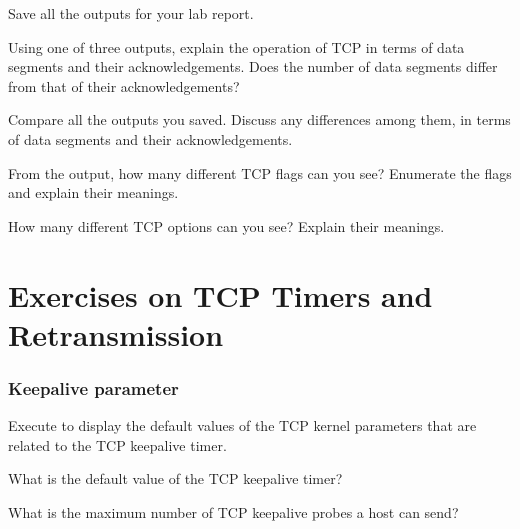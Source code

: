 \documentclass{../UTNetLab}
\begin{document}
    Save all the  outputs for your lab report.
    
    \begin{report}
        \item Using one of three  outputs, explain the operation of TCP in terms of data segments and their acknowledgements.
                Does the number of data segments differ from that of their acknowledgements?

            Compare all the  outputs you saved.
            Discuss any differences among them, in terms of data segments and their acknowledgements.
        
        \item From the  output, how many different TCP flags can you see? Enumerate the flags and explain their meanings.

            How many different TCP options can you see?
            Explain their meanings.
    \end{report}

\part{Exercises on TCP Timers and Retransmission}
\section{Keepalive parameter}
    Execute  to display the default values of the TCP kernel parameters that are related to the TCP keepalive timer.

    \begin{report}
        \item What is the default value of the TCP keepalive timer?
        
        \item What is the maximum number of TCP keepalive probes a host can send?
    \end{report}
\end{document}
